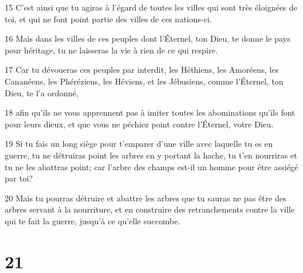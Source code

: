 \par 15 C'est ainsi que tu agiras à l'égard de toutes les villes qui sont très éloignées de toi, et qui ne font point partie des villes de ces nations-ci.
\par 16 Mais dans les villes de ces peuples dont l'Éternel, ton Dieu, te donne le pays pour héritage, tu ne laisseras la vie à rien de ce qui respire.
\par 17 Car tu dévoueras ces peuples par interdit, les Héthiens, les Amoréens, les Cananéens, les Phéréziens, les Héviens, et les Jébusiens, comme l'Éternel, ton Dieu, te l'a ordonné,
\par 18 afin qu'ils ne vous apprennent pas à imiter toutes les abominations qu'ils font pour leurs dieux, et que vous ne péchiez point contre l'Éternel, votre Dieu.
\par 19 Si tu fais un long siège pour t'emparer d'une ville avec laquelle tu es en guerre, tu ne détruiras point les arbres en y portant la hache, tu t'en nourriras et tu ne les abattras point; car l'arbre des champs est-il un homme pour être assiégé par toi?
\par 20 Mais tu pourras détruire et abattre les arbres que tu sauras ne pas être des arbres servant à la nourriture, et en construire des retranchements contre la ville qui te fait la guerre, jusqu'à ce qu'elle succombe.

\chapter{21}

